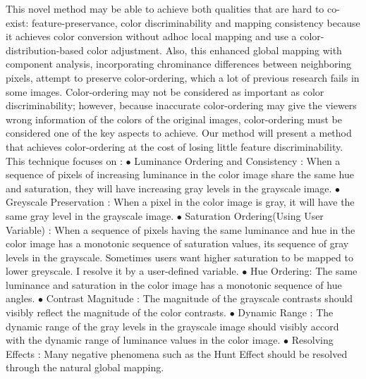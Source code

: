\documentclass{article}
\begin{document}
 This novel method may be able to achieve both qualities that are hard to co-exist: feature-preservance, color discriminability and mapping consistency because it achieves color conversion without adhoc local mapping and use a color-distribution-based color adjustment. Also, this enhanced global mapping with component analysis,  incorporating chrominance differences between neighboring pixels, attempt to preserve color-ordering, which a lot of previous research fails in some images.\newline
Color-ordering may not be considered as important as color discriminability; however, because inaccurate color-ordering may give the viewers wrong information of the colors of the original images, color-ordering must be considered one of the key aspects to achieve. Our method will present a method that achieves color-ordering at the cost of losing little feature discriminability.\newline
This technique focuses on :\newline
$\bullet$ Luminance Ordering and Consistency : When a sequence of pixels of increasing luminance in the color image share the same hue and saturation, they will have increasing gray levels in the grayscale image.\newline
$\bullet$ Greyscale Preservation : When a pixel in the color image is gray, it will have the same gray level in the grayscale image.\newline
$\bullet$ Saturation Ordering(Using User Variable) : When a sequence of pixels having the same luminance and hue in the color image has a monotonic sequence of saturation values, its sequence of gray levels in the grayscale. Sometimes users want higher saturation to be mapped to lower greyscale. I resolve it by a user-defined variable.\newline
$\bullet$ Hue Ordering: The same luminance and saturation in the color image has a monotonic sequence of hue angles.\newline
$\bullet$ Contrast Magnitude : The magnitude of the grayscale contrasts should visibly reflect the magnitude of the color contrasts.\newline
$\bullet$ Dynamic Range : The dynamic range of the gray levels in the grayscale image should visibly accord with the dynamic range of luminance values in the color image.\newline
$\bullet$ Resolving Effects : Many negative phenomena such as the Hunt Effect should be resolved through the natural global mapping.\newline
\end{document}
